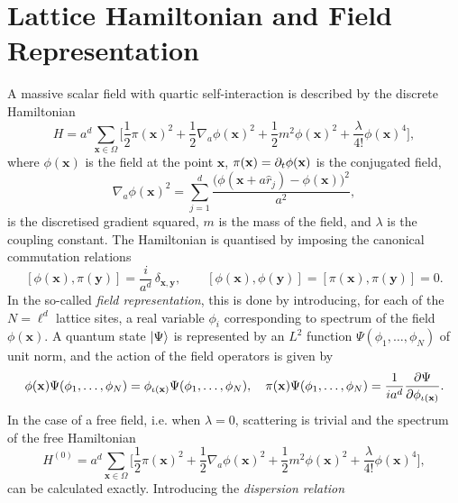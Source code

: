 \documentclass[a4paper,10pt]{report}
\begin{document}
\section{Lattice Hamiltonian and Field Representation}
A massive scalar field with quartic self-interaction is described by the discrete Hamiltonian
\begin{equation}
H = a^d\sum_{\mathbf{x}\in\Omega}\bigg[\frac{1}{2}\pi(\mathbf{x})^2 + \frac{1}{2}\nabla_a\phi(\mathbf{x})^2 + \frac{1}{2}m^2\phi(\mathbf{x})^2 + \frac{\lambda}{4!}\phi(\mathbf{x})^4\bigg],
\end{equation}
where $\phi(\mathbf{x})$ is the field at the point $\mathbf{x}$, $\pi(\mathbf{x}) = \partial_t\phi(\mathbf{x})$ is the conjugated field, 
\begin{equation}
\nabla_a\phi(\mathbf{x})^2 = \sum_{j=1}^d\frac{\big(\phi(\mathbf{x}+a\hat{r}_j)-\phi(\mathbf{x})\big)^2}{a^2},
\end{equation}
is the discretised gradient squared, $m$ is the mass of the field, and $\lambda$ is the coupling constant. The Hamiltonian is quantised by imposing the canonical commutation relations
\begin{equation}
\label{eq:ccr}
[\phi(\mathbf{x}),\pi(\mathbf{y})] = \frac{i}{a^d}\,\delta_{\mathbf{x},\mathbf{y}}, \qquad [\phi(\mathbf{x}),\phi(\mathbf{y})] = [\pi(\mathbf{x}),\pi(\mathbf{y})] = 0.
\end{equation}
In the so-called \textit{field representation}, this is done by introducing, for each of the $N = \ell^d$ lattice sites, a real variable $\phi_i$ corresponding to spectrum of the field $\phi(\mathbf{x})$. A quantum state $\ket{\Psi}$ is represented by an $L^2$ function $\Psi(\phi_1,\dots,\phi_N)$ of unit norm, and the action of the field operators is given by
\begin{equation}
\label{eq:canonical_repr}
\phi(\mathbf{x})\Psi(\phi_1,\dots,\phi_N) = \phi_{\iota(\mathbf{x})}\Psi(\phi_1,\dots,\phi_N), \quad \pi(\mathbf{x})\Psi(\phi_1,\dots,\phi_N) = \frac{1}{ia^d}\pdv{\Psi}{\phi_{\iota(\mathbf{x})}}.
\end{equation}
In the case of a free field, i.e. when $\lambda=0$, scattering is trivial and the spectrum of the free Hamiltonian
\begin{equation}
H^{(0)} = a^d\sum_{\mathbf{x}\in\Omega}\bigg[\frac{1}{2}\pi(\mathbf{x})^2 + \frac{1}{2}\nabla_a\phi(\mathbf{x})^2 + \frac{1}{2}m^2\phi(\mathbf{x})^2 + \frac{\lambda}{4!}\phi(\mathbf{x})^4\bigg],
\label{eq:free_ham}
\end{equation}
can be calculated exactly. Introducing the \textit{dispersion relation}
\end{document}
